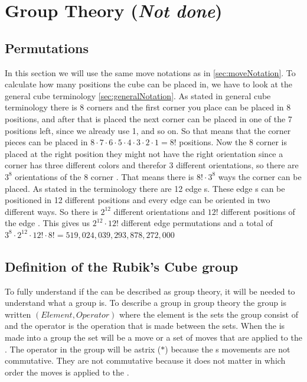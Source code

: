 \chapter{Group Theory (\textit{Not done})}


\section{Permutations}
In this section we will use the same move notations as in \ref{sec:moveNotation}.
To calculate how many positions the cube can be placed in, we have to look at the general cube terminology \ref{sec:generalNotation}.
As stated in general cube terminology there is 8 corners \cpiece{} and the first corner you place can be placed in 8 positions, and after that is placed the next corner \cpiece{} can be placed in one of the 7 positions left, since we already use 1, and so on. So that means that the corner pieces can be placed in $8\cdot7\cdot6\cdot5\cdot4\cdot3\cdot2\cdot1=8!$ positions. Now the 8 corner \cpiece{} is placed at the right position they might not have the right orientation since a corner \cpiece{} has three different colors and therefor 3 different orientations, so there are $3^8$ orientations of the 8 corner \cpiece{}. That means there is $8!\cdot3^8$ ways the corner \cpiece{} can be placed. As stated in the terminology there are 12 edge \cpiece{}s. These edge \cpiece{}s can be positioned in 12 different positions and every edge \cpiece{} can be oriented in two different ways. So there is $2^12$ different orientations and $12!$ different positions of the edge \cpiece{}. This gives us $2^{12}\cdot12!$ different edge permutations and a total of $3^8\cdot2^{12}\cdot12!\cdot8!=519,024,039,293,878,272,000$

\section{Definition of the Rubik's Cube group}
To fully understand if the \rubik{} can be described as group theory, it will be needed to understand what a group is.
To describe a group in group theory the group is written $(Element, Operator)$ where the element is the sets the group consist of and the operator is the operation that is made between the sets. When the \rubik{} is made into a group the set will be a move or a set of moves that are applied to the \rubik{}. The operator in the \rubik{} group will be astrix ($*$) because the \rubik{}s movements are not commutative. They are not commutative because it does not matter in which order the moves is applied to the \rubik{}\cite[p. 157]{Rubik87} .

